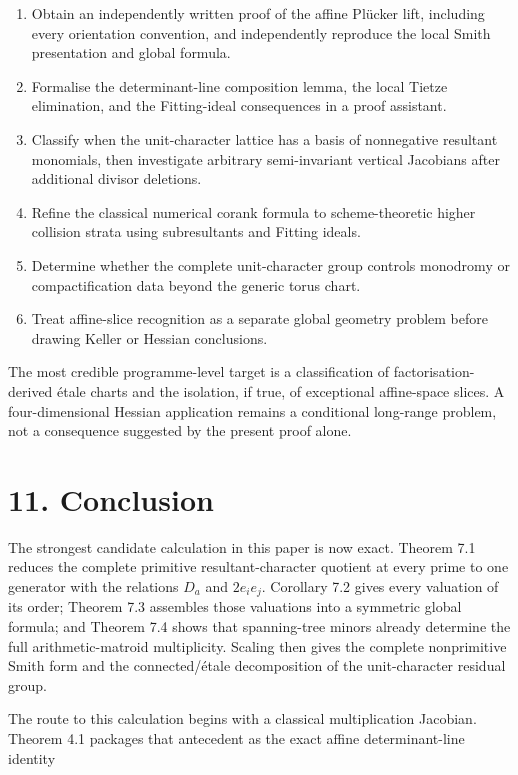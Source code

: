 \documentclass[
  11pt,
  a4paper,
]{article}
\providecommand{\tightlist}{%
  \setlength{\itemsep}{0pt}\setlength{\parskip}{0pt}}
\begin{document}
\begin{enumerate}
\def\labelenumi{\arabic{enumi}.}
\tightlist
\item
  Obtain an independently written proof of the affine Plücker lift,
  including every orientation convention, and independently reproduce
  the local Smith presentation and global formula.
\item
  Formalise the determinant-line composition lemma, the local Tietze
  elimination, and the Fitting-ideal consequences in a proof assistant.
\item
  Classify when the unit-character lattice has a basis of nonnegative
  resultant monomials, then investigate arbitrary semi-invariant
  vertical Jacobians after additional divisor deletions.
\item
  Refine the classical numerical corank formula to scheme-theoretic
  higher collision strata using subresultants and Fitting ideals.
\item
  Determine whether the complete unit-character group controls monodromy
  or compactification data beyond the generic torus chart.
\item
  Treat affine-slice recognition as a separate global geometry problem
  before drawing Keller or Hessian conclusions.
\end{enumerate}

The most credible programme-level target is a classification of
factorisation-derived étale charts and the isolation, if true, of
exceptional affine-space slices. A four-dimensional Hessian application
remains a conditional long-range problem, not a consequence suggested by
the present proof alone.

\section{11. Conclusion}\label{conclusion}

The strongest candidate calculation in this paper is now exact. Theorem
7.1 reduces the complete primitive resultant-character quotient at every
prime to one generator with the relations \(D_a\) and \(2e_ie_j\).
Corollary 7.2 gives every valuation of its order; Theorem 7.3 assembles
those valuations into a symmetric global formula; and Theorem 7.4 shows
that spanning-tree minors already determine the full arithmetic-matroid
multiplicity. Scaling then gives the complete nonprimitive Smith form
and the connected/étale decomposition of the unit-character residual
group.

The route to this calculation begins with a classical multiplication
Jacobian. Theorem 4.1 packages that antecedent as the exact affine
determinant-line identity
\end{document}
